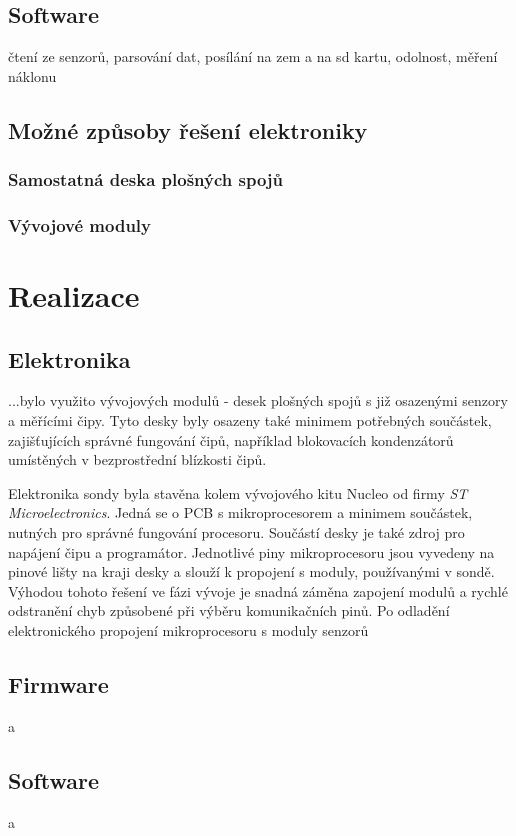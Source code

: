 \documentclass[twoside]{ctuthesis}
\theoremstyle{plain}
\theoremstyle{definition}
\theoremstyle{note}
\begin{document}
\section{Software}
čtení ze senzorů, parsování dat, posílání na zem a na sd kartu, odolnost, měření náklonu

\section{Možné způsoby řešení elektroniky}
\subsection{Samostatná deska plošných spojů}
\subsection{Vývojové moduly}


\chapter{Realizace}
\section{Elektronika}
...bylo využito vývojových modulů - desek plošných spojů s již osazenými senzory a měřícími čipy. Tyto desky byly osazeny také minimem potřebných součástek, zajišťujících správné fungování čipů, například blokovacích kondenzátorů umístěných v bezprostřední blízkosti čipů. 

Elektronika sondy byla stavěna kolem vývojového kitu Nucleo od firmy \textit{ST Microelectronics}. Jedná se o PCB s mikroprocesorem a minimem součástek, nutných pro správné fungování procesoru. Součástí desky je také zdroj pro napájení čipu a programátor. Jednotlivé piny mikroprocesoru jsou vyvedeny na pinové lišty na kraji desky a slouží k propojení s moduly, používanými v sondě. Výhodou tohoto řešení ve fázi vývoje je snadná záměna zapojení modulů a rychlé odstranění chyb způsobené při výběru komunikačních pinů. Po odladění elektronického propojení mikroprocesoru s moduly senzorů


\section{Firmware}
a
\section{Software}
a
\end{document}
